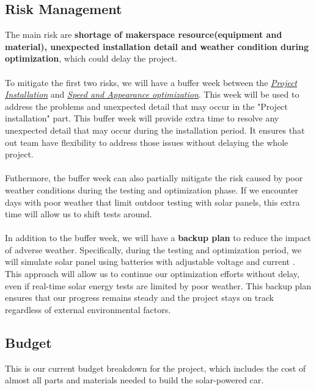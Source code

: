 \documentclass[12pt]{article}
\begin{document}
\subsection{Risk Management}
The main risk are \textbf{shortage of makerspace resource(equipment and material), unexpected installation detail and weather condition during optimization}, which could delay the project.
\\
\\
To mitigate the first two risks, we will have a buffer week between the \textit{\hyperref[sec:installation]{Project Installation}} and \textit{\hyperref[sec:Optimization]{Speed and Appearance optimization}}. 
This week will be used to address the problems and unexpected detail that may occur in the "Project installation" part. This buffer week will provide extra time to resolve any unexpected detail that may occur during the installation period.
It ensures that out team have flexibility to address those issues without delaying the whole project.
\\
\\
Futhermore, the buffer week can also partially mitigate the risk caused by poor weather conditions during the testing and optimization phase. 
If we encounter days with poor weather that limit outdoor testing with solar panels, 
this extra time will allow us to shift tests around.
\\
\\
In addition to the buffer week, we will have a \textbf{backup plan} to reduce the impact of adverse weather. Specifically, during the testing and optimization period, 
we will simulate solar panel using batteries with adjustable voltage and current                                           . 
This approach will allow us to continue our optimization efforts without delay, 
even if real-time solar energy tests are limited by poor weather. 
This backup plan ensures that our progress remains steady and the project stays on track regardless of external environmental factors.

\subsection{Budget}
This is our current budget breakdown for the project, which includes the cost of almost all parts and materials needed to build the solar-powered car.
\end{document}
